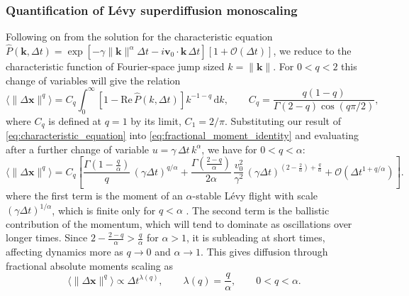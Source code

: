 \subsubsection*{Quantification of Lévy superdiffusion monoscaling}
Following on from the solution for the characteristic equation $\hat{P}(\textbf{k},\Delta t) = \exp\left[-\gamma\|\mathbf{k}\|^{\alpha}\Delta t - i\mathbf{v}_0\cdot\mathbf{k}\,\Delta t\right] [1 + \mathcal{O}(\Delta t)]$, we reduce to the characteristic function of Fourier-space jump sized $k=\|\textbf{k}\|$. For $0<q<2$ this change of variables will give the relation \cite{matsui_fractional_2016}
\begin{equation}\label{eq:fractional_moment_identity}
    \langle \| \Delta \mathbf{x} \|^q \rangle = C_q \int_0^\infty \left[ 1 - \mathrm{Re}\,\hat P(k,\Delta t) \right] k^{-1-q}\,\mathrm{d}k,
    \qquad C_q = \frac{q(1-q)}{\Gamma(2-q)\cos(q\pi/2)},
\end{equation}
where $C_q$ is defined at $q=1$ by its limit, $C_1 = 2/\pi$. Substituting our result of \cref{eq:characteristic_equation} into \cref{eq:fractional_moment_identity} and evaluating after a further change of variable $u = \gamma\,\Delta t\,k^{\alpha}$, we have for $0<q<\alpha$:
\begin{equation}\label{eq:fractional_moment_result}
    \langle \| \Delta \mathbf{x} \|^q \rangle = C_q\left[
        \frac{\Gamma\!\left(1-\frac{q}{\alpha}\right)}{q}\,(\gamma\Delta t)^{q/\alpha}
        + \frac{\Gamma\left(\frac{2-q}{\alpha}\right)}{2\alpha}\,\frac{v_0^2}{\gamma^{2}}\,(\gamma\Delta t)^{(2-\frac{2}{\alpha})+\frac{q}{\alpha}}
        + \mathcal{O}\!\left(\Delta t^{1+q/\alpha}\right)
    \right].
\end{equation}
where the first term is the moment of an $\alpha$-stable Lévy flight with scale $(\gamma\Delta t)^{1/\alpha}$, which is finite only for $q<\alpha$ \cite{samorodnitsky_stable_1994}. The second term is the ballistic contribution of the momentum, which will tend to dominate as oscillations over longer times. Since $2-\frac{2-q}{\alpha} > \frac{q}{\alpha}$ for $\alpha>1$, it is subleading at short times, affecting dynamics more as $q \rightarrow 0$ and $\alpha \rightarrow 1$. This gives diffusion through fractional absolute moments scaling as
\begin{equation}
    \langle \| \Delta \mathbf{x} \|^q \rangle \propto \Delta t^{\lambda(q)}, \qquad \lambda(q) = \frac{q}{\alpha}, \qquad 0<q<\alpha.
\end{equation}
